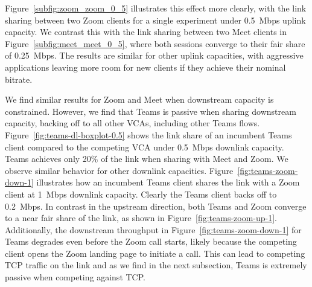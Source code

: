 Figure~\ref{subfig:zoom_zoom_0_5} illustrates this effect more clearly, with
the link sharing between two Zoom clients for a single experiment under
0.5~Mbps uplink capacity. We contrast this with the link sharing between two
Meet clients in Figure~\ref{subfig:meet_meet_0_5}, where both sessions converge to their
fair share of 0.25~Mbps. The results are similar for other uplink capacities,
with aggressive applications leaving more room for new clients if they achieve
their nominal bitrate.  

We find similar results for Zoom and Meet when downstream capacity is
constrained.
However, we find that Teams is passive when sharing downstream capacity, backing off to
all other VCAs, including other Teams flows. Figure~\ref{fig:teams-dl-boxplot-0.5} shows the
link share of an incumbent Teams client compared to the competing VCA under
0.5~Mbps downlink capacity. Teams achieves only 20\% of the link
when sharing with Meet and Zoom. We observe similar behavior for other downlink
capacities. Figure~\ref{fig:teams-zoom-down-1} illustrates how an incumbent
Teams client shares the link with a Zoom client at 1~Mbps downlink capacity.
Clearly the Teams client backs off to 0.2~Mbps. In contrast 
in the upstream direction, both Teams and Zoom converge to a near fair
share of the link, as shown in Figure~\ref{fig:teams-zoom-up-1}. 
Additionally, the downstream throughput in Figure~\ref{fig:teams-zoom-down-1} for Teams
degrades even before the Zoom call starts, likely because the
competing client opens the Zoom landing page to initiate a call. This can lead
to competing TCP traffic on the link and as we find in the next subsection,
Teams is extremely passive when competing against TCP. 



